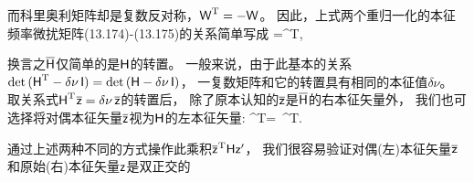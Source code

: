 {{而科里奥利矩阵却是复数反对称，$\mbox{${\sf W}$}^{\rm T}=-\mbox{${\sf W}$}$。
因此，上式两个重归一化的本征频率微扰矩阵(13.174)-(13.175)的关系简单写成
\eq \label{13.Htrans}
\overline{\ssH}=\ssH^{\rm T},
\en

换言之$\overline{\mbox{${\sf H}$}}$仅简单的是$\mbox{${\sf H}$}$的转置。
一般来说，由于此基本的关系${\rm det}\,(\mbox{${\sf H}$}^{\rm T}-\delta\nu\,\mbox{${\sf I}$})=
{\rm det}\,(\mbox{${\sf H}$}-\delta\nu\,\mbox{${\sf I}$})$，
一复数矩阵和它的转置具有相同的本征值$\delta\nu$。
取关系式$\mbox{${\sf H}$}^{\rm T}\hspace{0.2 mm}\overline{\mbox{${\sf z}$}}
=\delta\nu\,\overline{\mbox{${\sf z}$}}$的转置后，
除了原本认知的$\overline{\mbox{${\sf z}$}}$是$\overline{\mbox{${\sf H}$}}$的右本征矢量外，
我们也可选择将对偶本征矢量$\overline{\mbox{${\sf z}$}}$视为$\mbox{${\sf H}$}$的左本征矢量:
%
%
%
%
\eq \label{13.leftH}
\overline{\ssz}^{\hspace{0.1 mm}\rm T}\ssH=
\delta\nu\,\overline{\ssz}^{\hspace{0.1 mm}\rm T}.
\en

通过上述两种不同的方式操作此乘积$\overline{\mbox{${\sf z}$}}^{\hspace{0.1 mm}\rm T}\mbox{${\sf H}$}\mbox{${\sf z}$}'$，
我们很容易验证对偶(左)本征矢量$\overline{\mbox{${\sf z}$}}$和原始(右)本征矢量$\mbox{${\sf z}$}$是双正交的
}}
